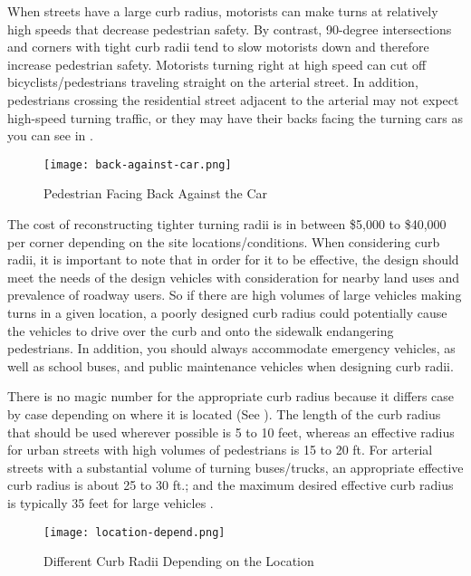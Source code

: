         When streets have a large curb radius, motorists can make turns at relatively high speeds that decrease pedestrian safety. By contrast, 90-degree intersections and corners with tight curb radii tend to slow motorists down and therefore increase pedestrian safety. Motorists turning right at high speed can cut off bicyclists/pedestrians traveling straight on the arterial street. In addition, pedestrians crossing the residential street adjacent to the arterial may not expect high-speed turning traffic, or they may have their backs facing the turning cars as you can see in .

\begin{figure}
\centering
	\texttt{[image: back-against-car.png]}
	\caption{Pedestrian Facing Back Against the Car}\label{fig:back-against-car}
\end{figure}

The cost of reconstructing tighter turning radii is in between \$5,000 to \$40,000 per corner depending on the site locations/conditions. When considering curb radii, it is important to note that in order for it to be effective, the design should meet the needs of the design vehicles with consideration for nearby land uses and prevalence of roadway users. So if there are high volumes of large vehicles making turns in a given location, a poorly designed curb radius could potentially cause the vehicles to drive over the curb and onto the sidewalk endangering pedestrians. In addition, you should always accommodate emergency vehicles, as well as school buses, and public maintenance vehicles when designing curb radii\cite{walking-info-curb}.


There is no magic number for the appropriate curb radius because it differs case by case depending on where it is located (See ). The length of the curb radius that should be used wherever possible is 5 to 10 feet, whereas an effective radius for urban streets with high volumes of pedestrians is 15 to 20 ft. For arterial streets with a substantial volume of turning buses/trucks, an appropriate effective curb radius is about 25 to 30 ft.; and the maximum desired effective curb radius is typically 35 feet for large vehicles \cite{walking-info-curb}.

\begin{figure}
\centering
	\texttt{[image: location-depend.png]}
	\caption{Different Curb Radii Depending on the Location}\label{fig:location-depend}
\end{figure}